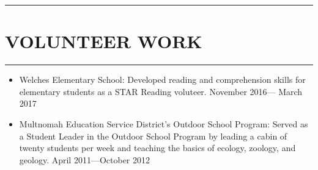 \documentclass[a4paper]{article}
\begin{document}
\noindent\rule{\textwidth}{1pt}\vspace{-1.5em}
\section*{VOLUNTEER WORK}\vspace{-1.5em}
\textcolor[RGB]{128,128,128}{\rule{\linewidth}{1pt}}

\begin{itemize}

\item Welches Elementary School: Developed reading and comprehension skills for elementary students as a STAR Reading voluteer. \hfill \textcolor[RGB]{128,128,128}{November 2016— March 2017}
\item Multnomah Education Service District's Outdoor School Program: Served as a Student Leader in the Outdoor School Program by leading a cabin of twenty students per week and teaching the basics of ecology, zoology, and geology. \hfill \textcolor[RGB]{128,128,128}{April 2011—October 2012}\\
    
\end{itemize}
\end{document}
